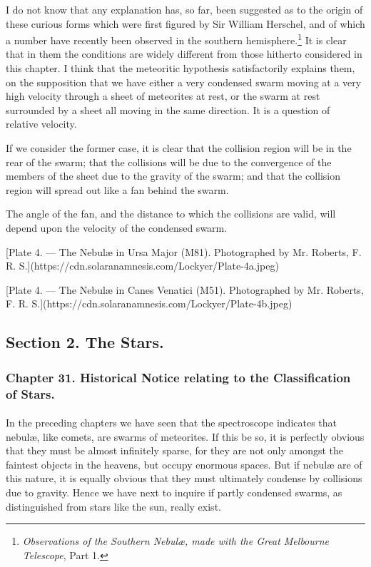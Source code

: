 \documentclass[a4paper, 12pt, oneside, polutonikogreek, english]{article}
\begin{document}
I do not know that any explanation has, so far, been suggested as to the origin of these curious forms which were first figured by Sir William Herschel, and of which a number have recently been observed in the southern hemisphere.\footnote{\emph{Observations of the Southern Nebulæ, made with the Great Melbourne Telescope}, Part 1.} It is clear that in them the conditions are widely different from those hitherto considered in this chapter. I think that the meteoritic hypothesis satisfactorily explains them, on the supposition that we have either a very condensed swarm moving at a very high velocity through a sheet of meteorites at rest, or the swarm at rest surrounded by a sheet all moving in the same direction. It is a question of relative velocity.

If we consider the former case, it is clear that the collision region will be in the rear of the swarm; that the collisions will be due to the convergence of the members of the sheet due to the gravity of the swarm; and that the collision region will spread out like a fan behind the swarm.

The angle of the fan, and the distance to which the collisions are valid, will depend upon the velocity of the condensed swarm.

[Plate 4. --- The Nebulæ in Ursa Major (M81). Photographed by Mr. Roberts, F. R. S.](https://cdn.solaranamnesis.com/Lockyer/Plate-4a.jpeg)

[Plate 4. --- The Nebulæ in Canes Venatici (M51). Photographed by Mr. Roberts, F. R. S.](https://cdn.solaranamnesis.com/Lockyer/Plate-4b.jpeg)
\clearpage
\subsection{Section 2. The Stars.}
\subsubsection{Chapter 31. Historical Notice relating to the Classification of Stars.}
\paragraph{}
In the preceding chapters we have seen that the spectroscope indicates that nebulæ, like comets, are swarms of meteorites. If this be so, it is perfectly obvious that they must be almost infinitely sparse, for they are not only amongst the faintest objects in the heavens, but occupy enormous spaces. But if nebulæ are of this nature, it is equally obvious that they must ultimately condense by collisions due to gravity. Hence we have next to inquire if partly condensed swarms, as distinguished from stars like the sun, really exist.
\end{document}
